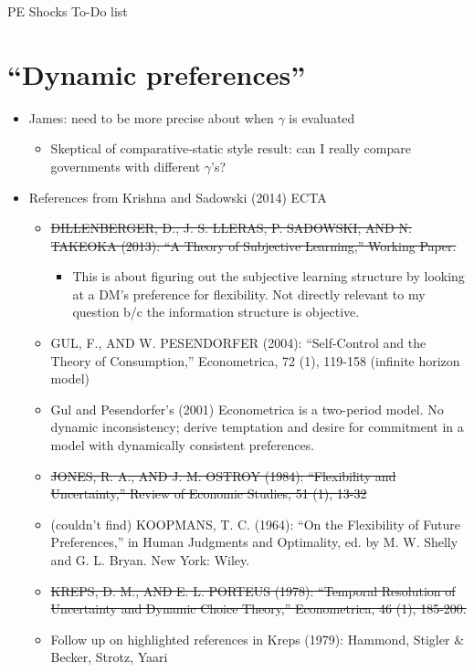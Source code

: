 \documentclass[12pt]{article}
\newcommand{\ga}{\gamma}
\begin{document}
\begin{center}
PE Shocks To-Do list
\end{center}

\section{``Dynamic preferences''}
	\begin{itemize}
		\item James: need to be more precise about when $\ga$ is evaluated
			\begin{itemize}
				\item Skeptical of comparative-static style result: can I really compare governments with different $\ga$'s?
			\end{itemize}
		\item References from Krishna and Sadowski (2014) ECTA
				\begin{itemize}
					\item \sout{DILLENBERGER, D., J. S. LLERAS, P. SADOWSKI, AND N. TAKEOKA (2013): ``A Theory of Subjective Learning,'' Working Paper.}
						\begin{itemize}
							\item This is about figuring out the subjective learning structure by looking at a DM's preference for flexibility. Not directly relevant to my question b/c the information structure is objective.
						\end{itemize}
					\item GUL, F., AND W. PESENDORFER (2004): ``Self-Control and the Theory of Consumption,'' Econometrica, 72 (1), 119-158 (infinite horizon model)
					\item Gul and Pesendorfer's (2001) Econometrica is a two-period model. No dynamic inconsistency; derive temptation and desire for commitment in a model with dynamically consistent preferences.
					\item \sout{JONES, R. A., AND J. M. OSTROY (1984): ``Flexibility and Uncertainty,'' Review of Economic Studies, 51 (1), 13-32}
					\item (couldn't find) KOOPMANS, T. C. (1964): ``On the Flexibility of Future Preferences,'' in Human Judgments and Optimality, ed. by M. W. Shelly and G. L. Bryan. New York: Wiley.
					\item \sout{KREPS, D. M., AND E. L. PORTEUS (1978): ``Temporal Resolution of Uncertainty and Dynamic Choice Theory,'' Econometrica, 46 (1), 185-200.}
					\item Follow up on highlighted references in Kreps (1979): Hammond, Stigler $\&$ Becker, Strotz, Yaari

\end{itemize}
\end{itemize}
\end{document}
